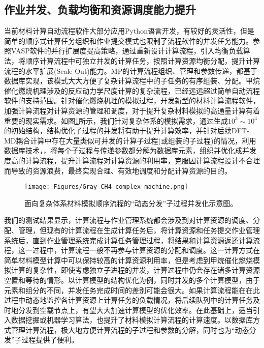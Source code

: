 \subsection{作业并发、负载均衡和资源调度能力提升}
当前材料计算自动流程软件大部分应用\textrm{Python}语言开发，有较好的灵活性，但是简单的顺序式计算任务组织和作业提交模式也限制了流程软件的并发任务能力。参照\textrm{VASP}软件的并行扩展度提高策略，通过重新设计计算流程，引入均衡负载算法，将顺序计算流程中可独立并发的计算任务，按照计算资源均衡分配，提升计算流程的水平扩展\textrm{(Scale Out)}能力。\textrm{MP}的计算流程组织、管理和参数传递，都基于数据库实现，该模式大大方便了复杂计算流程中的子任务的有序组装、分配。甲烷催化燃烧机理涉及的反应动力学尺度计算的复杂流程，已经远远超过简单自动流程软件的支持范围。针对催化燃烧机理的模拟过程，开发新型的材料计算流程软件，加强计算流程对计算资源的管理和调度，对于提升复杂材料模拟的高通量计算有着重要的现实需求。如图\ref{CH4_comp_BCC}所示，我们针对复杂体系的模拟需求，通过生成$10^3\sim10^4$的初始结构，结构优化子过程的并发将有助于提升计算效率，并针对后续\textrm{DFT-MD}耦合计算中存在大量类似可并发的计算子过程(或组装的子过程)的情况，利用数据库技术，，将每个子过程与传递参数都分解为数据库元素，组织并优化成并发度高的计算流程，提升计算流程对计算资源的利用率，克服因计算流程设计不合理而导致的资源浪费，最终实现合理、有效地调度和分配计算资源的目的。
\begin{figure}[h!]
\centering
\vskip -2pt
\texttt{[image: Figures/Gray-CH4\_complex\_machine.png]}
\caption{面向复杂体系材料模拟顺序流程的``动态分发''子过程并发化示意图。}%
\label{CH4_comp_BCC}
\end{figure}

我们的测试结果显示，计算流程与作业管理系统都会涉及到对计算资源的调度、分配、管理，但现有的计算流程在生成计算任务后，将计算资源和任务提交作业管理系统后，直到作业管理系统完成计算任务管理过程，将结果和计算资源返还计算流程，这一过程中，计算流程一般不再参与计算资源的分配和调度。这一计算方式在简单材料模型计算中可以保持较高的计算资源利用率，但是考虑到甲烷催化燃烧模拟计算的复杂性，即使考虑独立子进程的并发，计算过程中仍会存在诸多计算资源空置和等待的情形。以计算模型的结构优化为例，同时并发的多个计算模型，由于元素和组分的不同，并发任务完成时间的差别可能会很大。如果计算流程能在在此过程中动态地监控各计算资源上计算任务的负载情况，将后续队列中的计算任务及时地分发到空载节点上，有望大大加速计算模型的优化效率。在此基础上，适当引入数据挖掘或机器学习算法，也提升了材料模拟计算流程的计算速度。以数据库方式管理计算流程，极大地方便计算流程的子过程和参数的分解，同时也为``动态分发''子过程提供了便利。

